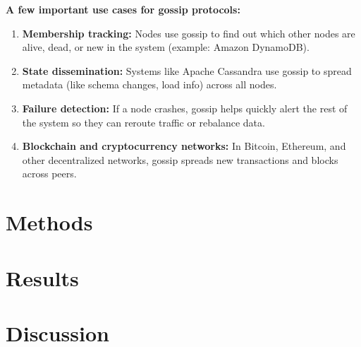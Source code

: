 \documentclass[a4paper,12pt]{article}
\begin{document}
\textbf{A few important use cases for gossip protocols:}
\begin{enumerate}
    \item \textbf{Membership tracking:} Nodes use gossip to find out which other nodes are alive, dead, or new in the system (example: Amazon DynamoDB).
    \item \textbf{State dissemination:} Systems like Apache Cassandra use gossip to spread metadata (like schema changes, load info) across all nodes.
    \item \textbf{Failure detection:} If a node crashes, gossip helps quickly alert the rest of the system so they can reroute traffic or rebalance data.
    \item \textbf{Blockchain and cryptocurrency networks:} In Bitcoin, Ethereum, and other decentralized networks, gossip spreads new transactions and blocks across peers.
\end{enumerate}

\section{Methods}

\section{Results}

\section{Discussion}
\end{document}
